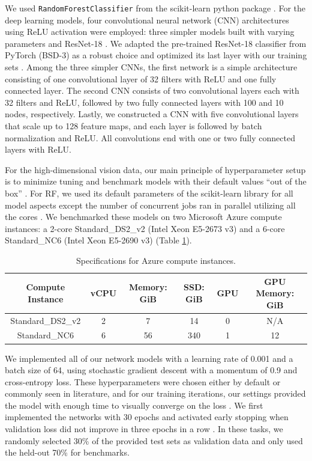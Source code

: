 We used \texttt{RandomForestClassifier} from the scikit-learn python package \citep{scikit-learn}. For the deep learning models, four convolutional neural network (CNN) architectures using ReLU activation were employed: three simpler models built with varying parameters and ResNet-18 \citep{Priebe2020.04.29.068460, resnet}. We adapted the pre-trained ResNet-18 classifier from PyTorch (BSD-3) as a robust choice and optimized its last layer with our training sets \citep{pytorch}. Among the three simpler CNNs, the first network is a simple architecture consisting of one convolutional layer of 32 filters with ReLU and one fully connected layer. The second CNN consists of two convolutional layers each with 32 filters and ReLU, followed by two fully connected layers with 100 and 10 nodes, respectively. Lastly, we constructed a CNN with five convolutional layers that scale up to 128 feature maps, and each layer is followed by batch normalization and ReLU. All convolutions end with one or two fully connected layers with ReLU.

For the high-dimensional vision data, our main principle of hyperparameter setup is to minimize tuning and benchmark models with their default values ``out of the box'' \citep{Probst2019hy}. For RF, we used its default parameters of the scikit-learn library for all model aspects except the number of concurrent jobs ran in parallel utilizing all the cores \citep{scikit-learn}. We benchmarked these models on two Microsoft Azure compute instances: a 2-core Standard\_DS2\_v2 (Intel Xeon E5-2673 v3) and a 6-core Standard\_NC6 (Intel Xeon E5-2690 v3) (Table \ref{table:azure}).

\begin{table}[htb]
\centering
\begin{tabular}{ |c|c|c|c|c|c| } 
\hline
Compute Instance & vCPU & Memory: GiB & SSD: GiB & GPU & GPU Memory: GiB \\
\hline
Standard\_DS2\_v2 & 2 & 7 & 14 & 0 & N/A \\
\hline
Standard\_NC6 & 6 & 56 & 340 & 1 & 12 \\
\hline
\end{tabular}
\caption{Specifications for Azure compute instances.}
\label{table:azure}
\end{table}

We implemented all of our network models with a learning rate of 0.001 and a batch size of 64, using stochastic gradient descent with a momentum of 0.9 and cross-entropy loss. These hyperparameters were chosen either by default or commonly seen in literature, and for our training iterations, our settings provided the model with enough time to visually converge on the loss \citep{Krizhevsky2012-sq, pmlr-v119-rice20a}.
We first implemented the networks with 30 epochs and activated early stopping when validation loss did not improve in three epochs in a row \citep{li2020, lutz, caruana}. In these tasks, we randomly selected 30\% of the provided test sets as validation data and only used the held-out 70\% for benchmarks.

